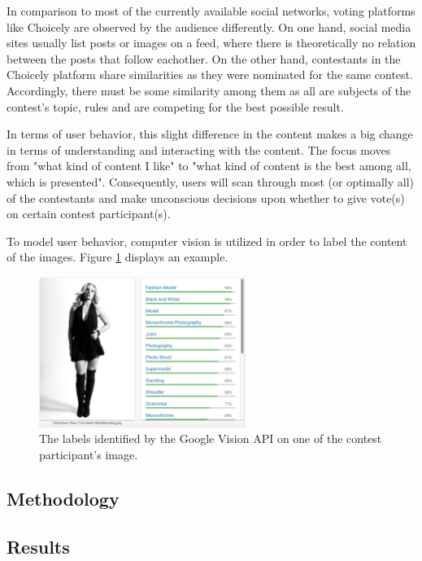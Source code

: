     In comparison to most of the currently available social networks, voting platforms like Choicely are observed by the audience differently. On one hand, social media sites usually list posts or images on a feed, where there is theoretically no relation between the posts that follow eachother. On the other hand, contestants in the Choicely platform share similarities as they were nominated for the same contest. Accordingly, there must be some similarity among them as all are subjects of the contest's topic, rules and are competing for the best possible result. 
    
    In terms of user behavior, this slight difference in the content makes a big change in terms of understanding and interacting with the content. The focus moves from "what kind of content I like" to "what kind of content is the best among all, which is presented". Consequently, users will scan through most (or optimally all) of the contestants and make unconscious decisions upon whether to give vote(s) on certain contest participant(s).

    To model user behavior, computer vision is utilized in order to label the content of the images. Figure \ref{google_vision_labels} displays an example.

    \begin{figure}[h] 
		\begin{center}
			\includegraphics[width=0.6\textwidth]{images/google_vision_labels.png}
			\caption{The labels identified by the Google Vision API on one of the contest participant's image.}
			\label{google_vision_labels}
		\end{center}
	\end{figure}

\subsection{Methodology}

\subsection{Results}
